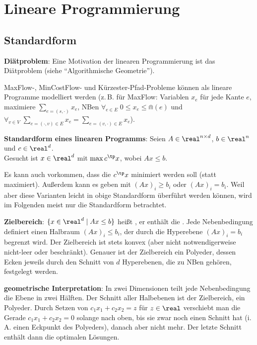 \chapter{%
    Lineare Programmierung%
}

\section{%
    Standardform%
}

\textbf{Diätproblem}:
Eine Motivation der linearen Programmierung ist das Diätproblem
(siehe "`Algorithmische Geometrie"').

MaxFlow-, MinCostFlow- und Kürzester-Pfad-Probleme können als lineare Programme modelliert werden
(z.\,B. für MaxFlow:
Variablen $x_e$ für jede Kante $e$,
maximiere $\sum_{e=(s,\cdot)} x_e$,
NBen $\forall_{e \in E}\; 0 \le x_e \le \Cap(e)$ und
$\forall_{v \in V}\; \sum_{e = (\cdot,v) \in E} x_e = \sum_{e = (v,\cdot) \in E} x_e$).

\linie

\textbf{Standardform eines linearen Programms}:
Seien $A \in \real^{n \times d}$, $b \in \real^n$ und $c \in \real^d$.\\
Gesucht ist $x \in \real^d$ mit $\max c^\tp x$, wobei $Ax \le b$.

Es kann auch vorkommen, dass die  $c^\tp x$ minimiert werden soll
(statt maximiert).
Außerdem kann es  geben mit $(Ax)_i \ge b_i$ oder $(Ax)_i = b_i$.
Weil aber diese Varianten leicht in obige Standardform überführt werden können,
wird im Folgenden meist nur die Standardform betrachtet.

\textbf{Zielbereich}:
$\{x \in \real^d \;|\; Ax \le b\}$ heißt ,
er enthält die .
Jede Nebenbedingung definiert einen Halbraum $(Ax)_i \le b_i$, der durch die Hyperebene
$(Ax)_i = b_i$ begrenzt wird.
Der Zielbereich ist stets konvex (aber nicht notwendigerweise nicht-leer oder beschränkt).
Genauer ist der Zielbereich ein Polyeder, dessen Ecken jeweils durch den Schnitt von
$d$ Hyperebenen, die zu NBen gehören, festgelegt werden.

\textbf{geometrische Interpretation}:
In zwei Dimensionen teilt jede Nebenbedingung die Ebene in zwei Hälften.
Der Schnitt aller Halbebenen ist der Zielbereich, ein Polyeder.
Durch Setzen von $c_1 x_1 + c_2 x_2 = z$ für $z \in \real$ verschiebt man die Gerade
$c_1 x_1 + c_2 x_2 = 0$ solange nach oben, bis sie zwar noch einen Schnitt hat
(i.\,A. einen Eckpunkt des Polyeders), danach aber nicht mehr.
Der letzte Schnitt enthält dann die optimalen Lösungen.

